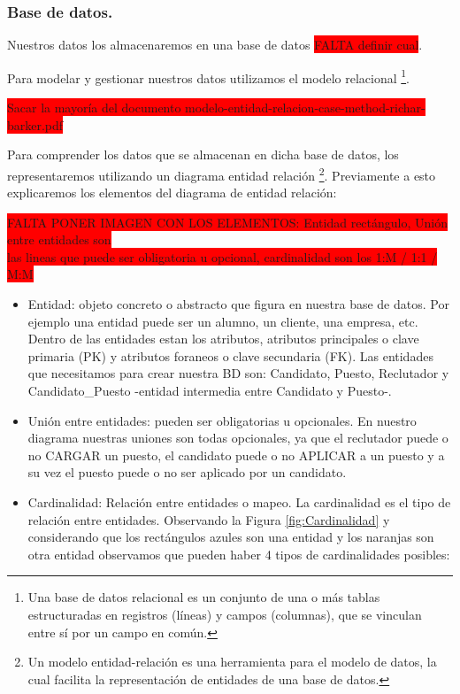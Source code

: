 \documentclass[12pt,a4paper]{article}
\begin{document}
\begin{sloppypar}
\cleardoublepage

\subsubsection{Base de datos.}

Nuestros datos los almacenaremos en una base de datos \colorbox{red}{FALTA definir cual}. 

Para modelar y gestionar nuestros datos utilizamos el modelo relacional \footnote{Una base de datos relacional es un conjunto de una o más tablas estructuradas en registros (líneas) y campos (columnas), que se vinculan entre sí por un campo en común.}.

\colorbox{red}{Sacar la mayoría del documento modelo-entidad-relacion-case-method-richar-barker.pdf} 

Para comprender los datos que se almacenan en dicha base de datos, los representaremos utilizando un diagrama entidad relación \footnote{Un modelo entidad-relación es una herramienta para el modelo de datos, la cual facilita la representación de entidades de una base de datos.}.
Previamente a esto explicaremos los elementos del diagrama de entidad relación: 

\colorbox{red}{FALTA PONER IMAGEN CON LOS ELEMENTOS: Entidad rectángulo, Unión entre entidades son} \\ \colorbox{red}{las lineas que puede ser obligatoria u opcional, cardinalidad son los 1:M / 1:1 / M:M}

\begin{itemize}
\item Entidad: objeto concreto o abstracto que figura en nuestra base de datos. Por ejemplo una entidad puede ser un alumno, un cliente, una empresa, etc. Dentro de las entidades estan los atributos, atributos principales o clave primaria (PK) y atributos foraneos o clave secundaria (FK).  Las entidades que necesitamos para crear nuestra BD son: Candidato, Puesto, Reclutador y Candidato\_Puesto -entidad intermedia entre Candidato y Puesto-.
\item Unión entre entidades: pueden ser obligatorias u opcionales. En nuestro diagrama nuestras uniones son todas opcionales, ya que el reclutador puede o no CARGAR un puesto, el candidato puede o no APLICAR a un puesto y a su vez el puesto puede o no ser aplicado por un candidato. 
\item Cardinalidad: Relación entre entidades o mapeo. La cardinalidad es el tipo de relación entre entidades. Observando la Figura \ref{fig:Cardinalidad} y considerando que los rectángulos azules son una entidad y los naranjas son otra entidad observamos que pueden haber 4 tipos de cardinalidades posibles:


\end{itemize}
\end{sloppypar}
\end{document}
